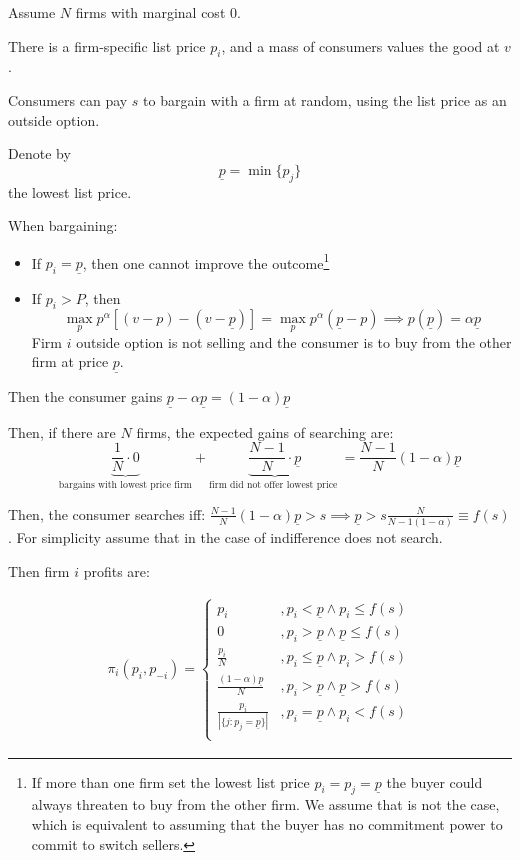 \documentclass[12pt]{article}
\theoremstyle{plain}
\theoremstyle{plain}
\begin{document}
Assume $N$ firms with marginal cost $0$.

There is a firm-specific list price $p_i$, and a mass of consumers values the good at $v$.

Consumers can pay $s$ to bargain with a firm at random, using the list price as an outside option.


Denote by
\[
\underline{p} = \min\{p_j\}
\]
the lowest list price.


When bargaining:
\begin{itemize}
    \item If $p_i = \underline{p}$, then one cannot improve the outcome\footnote{If more than one firm set the lowest list price $p_i = p_j = \underline{p}$ the buyer could always threaten to buy from the other firm. We assume that is not the case, which is equivalent to assuming that the buyer has no commitment power to commit to switch sellers.  }
    \item If $p_i > P$, then
    \[
    \max_{p} p^\alpha [(v - p) - (v - \underline{p} )] = \max_{p} p^\alpha (\underline{p}  - p) \implies p(\underline{p} ) = \alpha \underline{p} 
    \]
    Firm $i$ outside option is not selling and the consumer is to buy from the other firm at price $\underline{p} $.
\end{itemize}

Then the consumer gains $\underline{p} - \alpha \underline{p}  = (1-\alpha) \underline{p} $


Then, if there are $N$ firms, the expected gains of searching are:
\[
\underbrace{\frac{1}{N} \cdot 0}_{\text{bargains with lowest price firm}} + \underbrace{\frac{N - 1}{N} \cdot \underline{p}}_{\text{firm did not offer lowest price }} = \frac{N - 1}{N}(1 - \alpha)\underline{p}
\]

Then, the consumer searches iff: $\frac{N - 1}{N}(1 - \alpha)\underline{p}> s \implies \underline{p}> s \frac{N}{N-1(1-\alpha)}\equiv f(s)$. For  simplicity assume that in the case of indifference does not search. 

Then firm $i$ profits are: 

\begin{align}
    \pi_i(p_i, p_{-i}) = 
    \begin{cases}
        p_i &, p_i < \underline{p} \land p_i \leq f(s) \\
        0 &, p_i > \underline{p} \land \underline{p} \leq f(s) \\
        \frac{p_i}{N} &, p_i \leq \underline{p} \land p_i > f(s)\\
        \frac{(1-\alpha)\underline{p}}{N} &, p_i > \underline{p} \land \underline{p} > f(s) \\
        \frac{p_i}{|\{j: p_j =\underline{p}\}|} &, p_i = \underline{p} \land p_i < f(s)\\      
    \end{cases}
\end{align}
\end{document}
